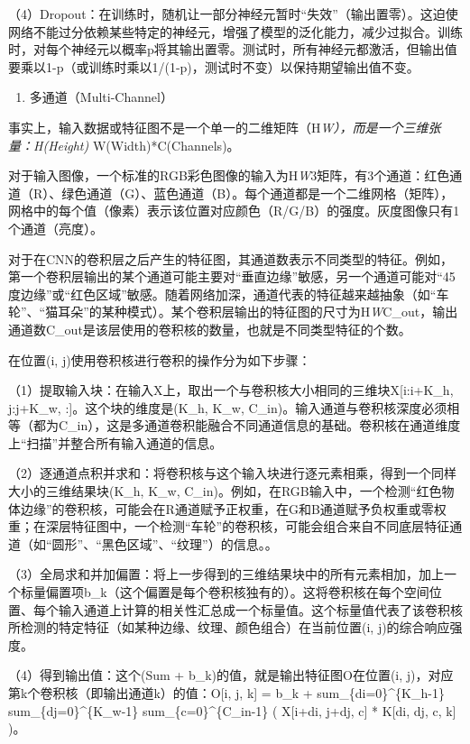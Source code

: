 （4）Dropout：在训练时，随机让一部分神经元暂时``失效''（输出置零）。这迫使网络不能过分依赖某些特定的神经元，增强了模型的泛化能力，减少过拟合。训练时，对每个神经元以概率p将其输出置零。测试时，所有神经元都激活，但输出值要乘以1-p（或训练时乘以1/(1-p)，测试时不变）以保持期望输出值不变。

\begin{enumerate}
\def\labelenumi{\arabic{enumi}.}
\setcounter{enumi}{5}
\tightlist
\item
  多通道（Multi-Channel）
\end{enumerate}

事实上，输入数据或特征图不是一个单一的二维矩阵（H\emph{W），而是一个三维张量：H(Height) }W(Width)*C(Channels)。

对于输入图像，一个标准的RGB彩色图像的输入为H\emph{W}3矩阵，有3个通道：红色通道（R）、绿色通道（G）、蓝色通道（B）。每个通道都是一个二维网格（矩阵），网格中的每个值（像素）表示该位置对应颜色（R/G/B）的强度。灰度图像只有1个通道（亮度）。

对于在CNN的卷积层之后产生的特征图，其通道数表示不同类型的特征。例如，第一个卷积层输出的某个通道可能主要对``垂直边缘''敏感，另一个通道可能对``45度边缘''或``红色区域''敏感。随着网络加深，通道代表的特征越来越抽象（如``车轮''、``猫耳朵''的某种模式）。某个卷积层输出的特征图的尺寸为H\emph{W}C\_out，输出通道数C\_out是该层使用的卷积核的数量，也就是不同类型特征的个数。

在位置(i, j)使用卷积核进行卷积的操作分为如下步骤：

（1）提取输入块：在输入X上，取出一个与卷积核大小相同的三维块X{[}i:i+K\_h, j:j+K\_w, :{]}。这个块的维度是(K\_h, K\_w, C\_in)。输入通道与卷积核深度必须相等（都为C\_in），这是多通道卷积能融合不同通道信息的基础。卷积核在通道维度上``扫描''并整合所有输入通道的信息。

（2）逐通道点积并求和：将卷积核与这个输入块进行逐元素相乘，得到一个同样大小的三维结果块(K\_h, K\_w, C\_in)。例如，在RGB输入中，一个检测``红色物体边缘''的卷积核，可能会在R通道赋予正权重，在G和B通道赋予负权重或零权重；在深层特征图中，一个检测``车轮''的卷积核，可能会组合来自不同底层特征通道（如``圆形''、``黑色区域''、``纹理''）的信息。。

（3）全局求和并加偏置：将上一步得到的三维结果块中的所有元素相加，加上一个标量偏置项b\_k（这个偏置是每个卷积核独有的）。这将卷积核在每个空间位置、每个输入通道上计算的相关性汇总成一个标量值。这个标量值代表了该卷积核所检测的特定特征（如某种边缘、纹理、颜色组合）在当前位置(i, j)的综合响应强度。

（4）得到输出值：这个(Sum + b\_k)的值，就是输出特征图O在位置(i, j)，对应第k个卷积核（即输出通道k）的值：O{[}i, j, k{]} = b\_k + sum\_\{di=0\}\^{}\{K\_h-1\} sum\_\{dj=0\}\^{}\{K\_w-1\} sum\_\{c=0\}\^{}\{C\_in-1\} ( X{[}i+di, j+dj, c{]} * K{[}di, dj, c, k{]} )。


